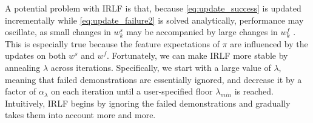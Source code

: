 \documentclass{aamas2016}
\DeclareMathOperator*{\argmax}{\arg\!\max}
\newcommand{\sw}[1]{\textcolor{red}{SW: #1}}
\newcommand{\jm}[1]{\textcolor{blue}{Joao: #1}}
\newcommand{\ks}[1]{\textcolor{dark_green}{Kyriacos: #1}}
\newcommand{\sw}[1]{}
\newcommand{\jm}[1]{}
\newcommand{\ks}[1]{}
\begin{document}
A potential problem with IRLF is that, because \eqref{eq:update_success} is updated incrementally while \eqref{eq:update_failure2} is solved analytically, performance may oscillate, as small changes in $w^s_k$ may be accompanied by large changes in $w^f_k$ 
.
This is especially true because the feature expectations of $\pi$ are influenced by the updates on both $w^s$ and $w^f$. Fortunately, we can make IRLF more stable by annealing $\lambda$ across iterations.  Specifically, we start with a large value of $\lambda$, meaning that failed demonstrations are essentially ignored, and decrease it by a factor of $\alpha_{\lambda}$ 
on each iteration until a user-specified floor $\lambda_{min}$ 
is reached.  Intuitively, IRLF begins by ignoring the failed demonstrations and gradually takes them into account more and more.

	




\end{document}
